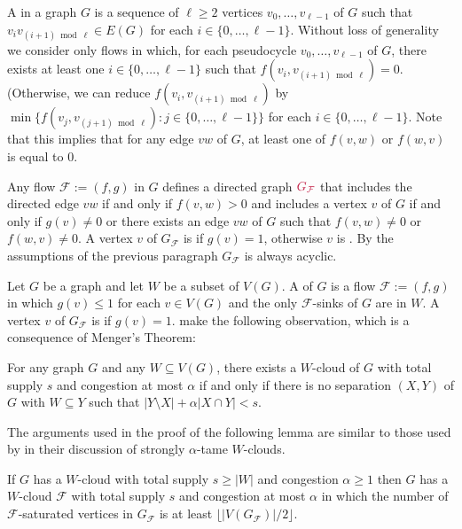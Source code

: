 \documentclass{patmorin}
\begin{document}
A  in a graph $G$ is a sequence of $\ell\ge 2$ vertices $v_0,\ldots,v_{\ell-1}$ of $G$ such that $v_iv_{(i+1)\bmod\ell}\in E(G)$ for each $i\in\{0,\ldots,\ell-1\}$.
Without loss of generality we consider only flows in which, for each pseudocycle $v_0,\ldots,v_{\ell-1}$ of $G$, there exists at least one $i\in\{0,\ldots,\ell-1\}$ such that $f(v_i,v_{(i+1)\bmod\ell})=0$.  (Otherwise, we can reduce $f(v_i,v_{(i+1)\bmod \ell})$ by $\min\{f(v_j,v_{(j+1)\bmod\ell}):j\in\{0,\ldots,\ell-1\}\}$ for each $i\in\{0,\ldots,\ell-1\}$.  Note that this implies that for any edge $vw$ of $G$, at least one of $f(v,w)$ or $f(w,v)$ is equal to $0$.

Any flow $\mathcal{F}:=(f,g)$ in $G$ defines a directed graph $\mathdefin{G_{\mathcal{F}}}$ that includes the directed edge $vw$ if and only if $f(v,w)>0$ and includes a vertex $v$ of $G$ if and only if $g(v)\neq 0$ or there exists an edge $vw$ of $G$ such that $f(v,w)\neq 0$ or $f(w,v)\neq 0$.  A vertex $v$ of $G_\mathcal{F}$ is  if $g(v)=1$, otherwise $v$ is .  By the assumptions of the previous paragraph $G_{\mathcal{F}}$ is always acyclic.

Let $G$ be a graph and let $W$ be a subset of $V(G)$.  A  of $G$ is a flow $\mathcal{F}:=(f,g)$ in which $g(v)\le 1$ for each $v\in V(G)$ and the only $\mathcal{F}$-sinks of $G$ are in $W$.  A vertex $v$ of $G_{\mathcal{F}}$ is  if $g(v)=1$. \citet{dvorak.norin:treewidth} make the following observation, which is a  consequence of Menger's Theorem:

\begin{obs}\label{flow_vs_cut}
  For any graph $G$ and any $W\subseteq V(G)$, there exists a $W$-cloud of $G$ with total supply $s$ and congestion at most $\alpha$ if and only if there is no separation $(X,Y)$ of $G$ with $W\subseteq Y$ such that $|Y\setminus X| + \alpha|X\cap Y| < s$.
\end{obs}

The arguments used in the proof of the following lemma are similar to those used by \citet{dvorak.norin:treewidth} in their discussion of strongly $\alpha$-tame $W$-clouds.

\begin{lem}\label{tame_w_cloud}
  If $G$ has a $W$-cloud with total supply $s\ge |W|$ and congestion $\alpha\ge 1$ then $G$ has a $W$-cloud $\mathcal{F}$ with total supply $s$ and congestion at most $\alpha$ in which the number of $\mathcal{F}$-saturated vertices in $G_\mathcal{F}$ is at least $\lfloor|V(G_{\mathcal{F}})|/2\rfloor$.
\end{lem}
\end{document}
